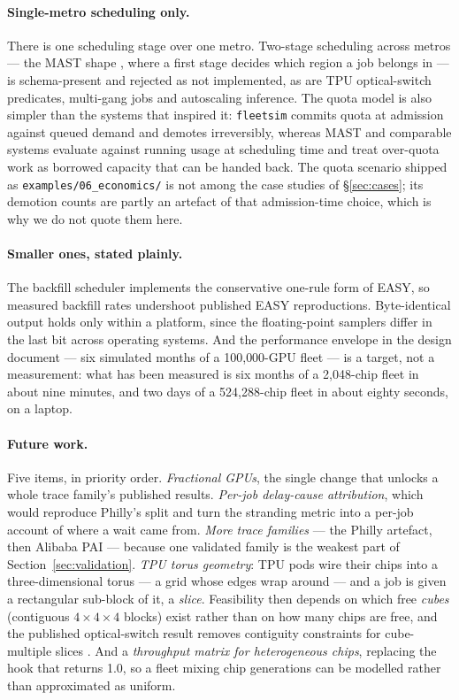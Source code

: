 \paragraph{Single-metro scheduling only.}
There is one scheduling stage over one metro. Two-stage scheduling across metros
--- the MAST shape \cite{mast2024}, where a first stage decides which region a job
belongs in --- is schema-present and rejected as not implemented, as are TPU
optical-switch predicates, multi-gang jobs and autoscaling inference. The quota
model is also simpler than the systems that inspired it: \texttt{fleetsim}
commits quota at admission against queued demand and demotes irreversibly,
whereas MAST and comparable systems evaluate against running usage at scheduling
time and treat over-quota work as borrowed capacity that can be handed back. The
quota scenario shipped as \texttt{examples/06\_economics/} is not among the case
studies of \S\ref{sec:cases}; its demotion counts are partly an artefact of that
admission-time choice, which is why we do not quote them here.

\paragraph{Smaller ones, stated plainly.}
The backfill scheduler implements the conservative one-rule form of EASY, so
measured backfill rates undershoot published EASY reproductions. Byte-identical
output holds only within a platform, since the floating-point samplers differ in
the last bit across operating systems. And the performance envelope in the design
document --- six simulated months of a 100{,}000-GPU fleet --- is a target, not a
measurement: what has been measured is six months of a 2{,}048-chip fleet in
about nine minutes, and two days of a 524{,}288-chip fleet in about eighty
seconds, on a laptop.

\paragraph{Future work.}
Five items, in priority order. \emph{Fractional GPUs}, the single
change that unlocks a whole trace family's published results. \emph{Per-job
delay-cause attribution}, which would reproduce Philly's split and turn the
stranding metric into a per-job account of where a wait came from. \emph{More
trace families} --- the Philly artefact, then Alibaba PAI --- because one
validated family is the weakest part of Section~\ref{sec:validation}. \emph{TPU
torus geometry}: TPU pods wire their chips into a three-dimensional torus --- a
grid whose edges wrap around --- and a job is given a rectangular sub-block of
it, a \emph{slice}. Feasibility then depends on which free \emph{cubes}
(contiguous $4 \times 4 \times 4$ blocks) exist rather than on how many chips are
free, and the published optical-switch result removes contiguity constraints for
cube-multiple slices \cite{tpuv4isca2023}. And a
\emph{throughput matrix for heterogeneous chips}, replacing the hook that returns
1.0, so a fleet mixing chip generations can be modelled rather than approximated
as uniform.

